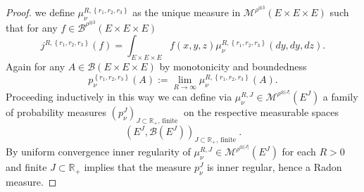 \documentclass[a4paper,12pt]{article}
\theoremstyle{definition}
\theoremstyle{remark}
\numberwithin{equation}{section}
\numberwithin{theorem}{section}
\begin{document}
\begin{proof}
we define
 $\mu_{\nu}^{R,\left\{ r_{1},r_{2},r_{3}\right\} }$ as
the unique measure in $\mathcal{M}^{\rho^{\otimes 3}}(E\times E\times E)$ such that for any $
f\in\mathcal{\mathscr{B}}^{\rho^{\otimes 3}}(E\times E\times E)$ 
\[
j^{R,\left\{ r_{1},r_{2},r_{3}\right\} }(f)=\int_{E\times E \times E}f(x,y,z)\mu_{\nu}^{R,\left\{ r_{1},r_{2},r_{3}\right\} }(dy,dy,dz).
\]
Again for any $A\in\mathcal{B}\left(E\times E\times E\right)$
by monotonicity and boundedness
\[
p_{\nu}^{\left\{ r_{1},r_{2},r_{3}\right\} }(A):=\underset{R\rightarrow\infty}{\lim}\mu_{\nu}^{R,\left\{ r_{1},r_{2},r_{3}\right\} }(A).
\]
Proceeding inductively  in this way we can define via $\mu_{\nu}^{R,J}\in\mathcal{M}^{\rho^{\otimes |J|}}(E^{J})$ a family of probability measures
$
\left(p_{\nu}^{J}\right)_{J\subset\mathbb{R}_{+},\,\text{finite }}
$
on the respective measurable spaces
$$
\left(E^{J},\mathcal{B}\left(E^{J}\right)\right)_{J\subset\mathbb{R}_{+},\,\text{finite }}.$$
 By uniform convergence inner regularity of $\mu_{\nu}^{R,J}\in\mathcal{M}^{\rho^{\otimes |J|}}(E^{J})$ for each $R>0$ and finite
$J\subset\mathbb{R}_{+}$ implies
 that  the measure $p_{\nu}^{J}$ is inner regular,
hence a Radon measure. 


\end{proof}
\end{document}
